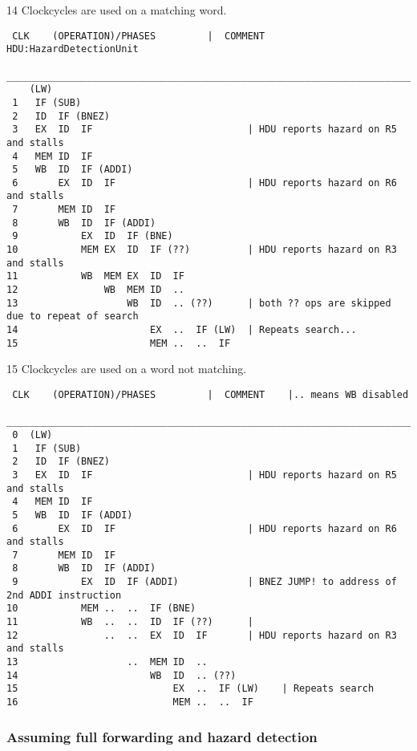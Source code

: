 \documentclass[a4paper,10pt]{article}
\begin{document}
14 Clockcycles are used on a matching word.
\begin{verbatim}
 CLK    (OPERATION)/PHASES         |  COMMENT   HDU:HazardDetectionUnit
 ________________________________________________________________________________________________
    (LW)  
 1   IF (SUB)
 2   ID  IF (BNEZ) 
 3   EX  ID  IF                           | HDU reports hazard on R5 and stalls
 4   MEM ID  IF     
 5   WB  ID  IF (ADDI)
 6       EX  ID  IF                       | HDU reports hazard on R6 and stalls
 7       MEM ID  IF    
 8       WB  ID  IF (ADDI) 
 9           EX  ID  IF (BNE)
10           MEM EX  ID  IF (??)          | HDU reports hazard on R3 and stalls
11           WB  MEM EX  ID  IF           
12               WB  MEM ID  ..   
13                   WB  ID  .. (??)      | both ?? ops are skipped due to repeat of search
14                       EX  ..  IF (LW)  | Repeats search...
15                       MEM ..  ..  IF   
\end{verbatim}


15 Clockcycles are used on a word not matching.
\begin{verbatim}
 CLK    (OPERATION)/PHASES         |  COMMENT    |.. means WB disabled
 ________________________________________________________________________________________________
 0  (LW)  
 1   IF (SUB)
 2   ID  IF (BNEZ) 
 3   EX  ID  IF                           | HDU reports hazard on R5 and stalls
 4   MEM ID  IF     
 5   WB  ID  IF (ADDI)
 6       EX  ID  IF                       | HDU reports hazard on R6 and stalls
 7       MEM ID  IF    
 8       WB  ID  IF (ADDI)
 9           EX  ID  IF (ADDI)            | BNEZ JUMP! to address of 2nd ADDI instruction
10           MEM ..  ..  IF (BNE)
11           WB  ..  ..  ID  IF (??)      | 
12               ..  ..  EX  ID  IF       | HDU reports hazard on R3 and stalls
13                   ..  MEM ID  ..  
14                       WB  ID  .. (??)
15                           EX  ..  IF (LW)    | Repeats search
16                           MEM ..  ..  IF
\end{verbatim}




\newpage

\subsubsection{Assuming full forwarding and hazard detection}
\end{document}
